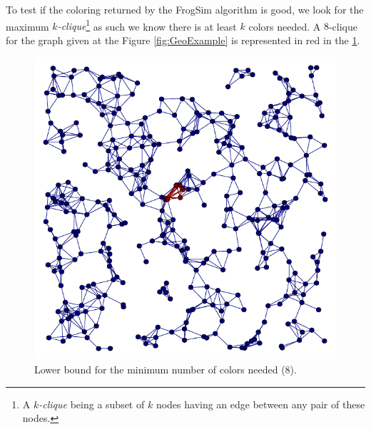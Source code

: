 \documentclass[letterpaper]{article}
\begin{document}
To test if the coloring returned by the FrogSim algorithm is good, we look for the maximum \emph{$k$-clique}\footnote{A \emph{$k$-clique} being a subset of $k$ nodes having an edge between any pair of these nodes.} as such we know there is at least $k$ colors needed. A $8$-clique for the graph given at the Figure \ref{fig:GeoExample} is represented in red in the \ref{fig:GeoFullyConnected}.
\begin{figure}[h]
\centering
\includegraphics[scale=0.55]{./Figures/geo-sub_fully_connected.pdf}
\caption{Lower bound for the minimum number of colors needed (8).} \label{fig:GeoFullyConnected}
\end{figure}
\end{document}
